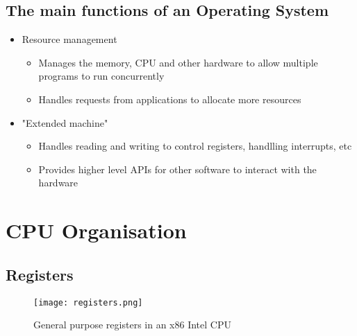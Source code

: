 \subsection*{The main functions of an Operating System}

\begin{itemize}
  \item Resource management
  \begin{itemize}
    \item Manages the memory, CPU and other hardware to allow multiple programs to run concurrently
    \item Handles requests from applications to allocate more resources
  \end{itemize}
  \item "Extended machine"
  \begin{itemize}
    \item Handles reading and writing to control registers, handlling interrupts, etc
    \item Provides higher level APIs for other software to interact with the hardware
  \end{itemize}
\end{itemize}

\section*{CPU Organisation}

\subsection*{Registers}

\begin{figure}[h]
  \caption{General purpose registers in an x86 Intel CPU}
  \centering
  \texttt{[image: registers.png]}
\end{figure}